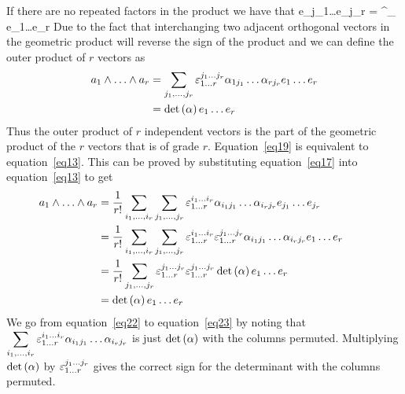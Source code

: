 If there are no repeated factors in the product we have that
\be
	e_{j_{1}}\dots e_{j_{r}} = \varepsilon^{}_{}
        e_{1}\dots e_{r}		
\ee
Due to the fact that interchanging two adjacent orthogonal vectors in the geometric
product will reverse the sign of the product and we can define the outer product of 
$r$ vectors as
\begin{align}
\wprod{a_{1}}{a_{r}} & = \Sum{j_{1}}{j_{r}}\varepsilon^{\vprod{j_{1}}{j_{r}}}_{\vprod{1}{r}} 
                           \vprod{\alpha_{1j_{1}}}{\alpha_{rj_{r}}}e_{1}\dots e_{r} \label{eq19}\\
		     & = \det\paren{\alpha}e_{1}\dots e_{r}
\end{align}
Thus the outer product of $r$ independent vectors is the part of the geometric product
of the $r$ vectors that is of grade $r$. Equation~\ref{eq19} is equivalent to equation~\ref{eq13}.
This can be proved by substituting equation~\ref{eq17} into equation~\ref{eq13} to get
\begin{align}
	\hspace{-24pt}\wprod{a_{1}}{a_{r}} & =
        \bfrac{1}{r!}\Sum{i_{1}}{i_{r}}\Sum{j_{1}}{j_{r}}\varepsilon^{\vprod{i_{1}}{i_{r}}}_{\vprod{1}{r}} 
	\vprod{\alpha_{i_{1}j_{1}}}{\alpha_{i_{r}j_{r}}}\vprod{e_{j_{1}}}{e_{j_{r}}}\\
	\hspace{-24pt} & =
	\bfrac{1}{r!}\Sum{i_{1}}{i_{r}}\Sum{j_{1}}{j_{r}}\varepsilon^{\vprod{i_{1}}{i_{r}}}_{\vprod{1}{r}}
	\varepsilon^{\vprod{j_{1}}{j_{r}}}_{\vprod{1}{r}}  
	\vprod{\alpha_{i_{1}j_{1}}}{\alpha_{i_{r}j_{r}}}\vprod{e_{1}}{e_{r}} \label{eq22}\\
	\hspace{-24pt} & =
	\bfrac{1}{r!}\Sum{j_{1}}{j_{r}}\varepsilon^{\vprod{j_{1}}{j_{r}}}_{\vprod{1}{r}}
	\varepsilon^{\vprod{j_{1}}{j_{r}}}_{\vprod{1}{r}}  
	\det\paren{\alpha}\vprod{e_{1}}{e_{r}} \label{eq23}\\
	\hspace{-24pt} & = \det\paren{\alpha}\vprod{e_{1}}{e_{r}} \label{eq24}\
\end{align}
We go from equation~\ref{eq22} to equation~\ref{eq23} by noting that 
${\displaystyle\sum_{{i_{1}},\dots,{i_{r}}}\varepsilon^{{i_{1}}\dots{i_{r}}}_{{1}\dots{r}}{\alpha_{i_{1}j_{1}}}\dots{\alpha_{i_{r}j_{r}}}}$ is just $\det\left ( {\alpha} \right )$ with the columns permuted.
Multiplying $\det\left ( {\alpha} \right )$ by $\varepsilon^{{j_{1}}\dots{j_{r}}}_{{1}\dots{r}}$ 
gives the correct sign for the determinant with the columns permuted.  

